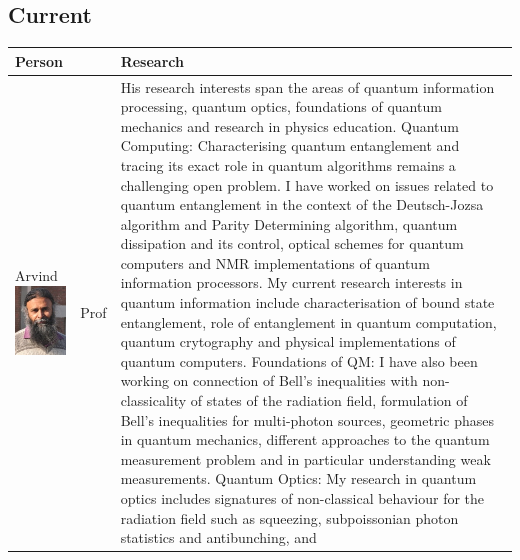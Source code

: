 \documentclass[11pt]{article}
\begin{document}
\subsection{Current}
\label{sec-2-1}
\begin{center}
\begin{tabular}{lll}
Person &  & Research\\
\hline
Arvind \includegraphics[width=.9\linewidth]{./images/arvind.jpg} & Prof & His research interests span the areas of quantum information processing, quantum optics, foundations of quantum mechanics and research in physics education. Quantum Computing: Characterising quantum entanglement and tracing its exact role in quantum algorithms remains a challenging open problem. I have worked on issues related to quantum entanglement in the context of the Deutsch-Jozsa algorithm and Parity Determining algorithm, quantum dissipation and its control, optical schemes for quantum computers and NMR implementations of quantum information processors. My current research interests in quantum information include characterisation of bound state entanglement, role of entanglement in quantum computation, quantum crytography and physical implementations of quantum computers. Foundations of QM: I have also been working on connection of Bell's inequalities with non-classicality of states of the radiation field, formulation of Bell's inequalities for multi-photon sources, geometric phases in quantum mechanics, different approaches to the quantum measurement problem and in particular understanding weak measurements. Quantum Optics: My research in quantum optics includes signatures of non-classical behaviour for the radiation field such as squeezing, subpoissonian photon statistics and antibunching, and 
\end{tabular}
\end{center}
\end{document}

